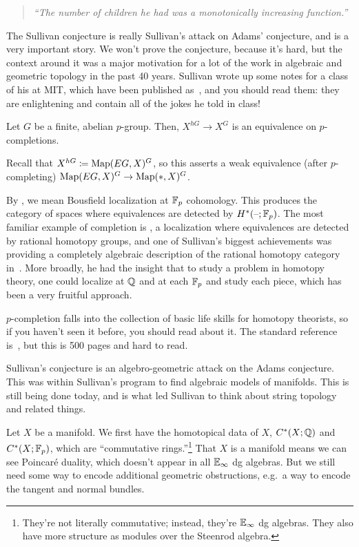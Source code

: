 \begin{quote}\textit{
	``The number of children he had was a monotonically increasing function.''
}\end{quote}
The Sullivan conjecture is really Sullivan's attack on Adams' conjecture, and is a very important story. We won't
prove the conjecture, because it's hard, but the context around it was a major motivation for a lot of the work in
algebraic and geometric topology in the past 40 years. Sullivan wrote up some notes for a class of his at MIT,
which have been published as~\cite{MITNotes}, and you should read them: they are enlightening and contain all of
the jokes he told in class!
\begin{thm}
\label{sullivan}
Let $G$ be a finite, abelian $p$-group. Then, $X^{hG}\to X^G$ is an equivalence on $p$-completions.
\end{thm}
Recall that $X^{hG} \coloneqq\operatorname{Map}(EG, X)^G$, so this asserts a weak equivalence (after $p$-completing) $\operatorname{Map}(EG,
X)^G\to\operatorname{Map}(*, X)^G$.

By , we mean Bousfield localization at $\mathbb F_p$ cohomology. This
produces the category of spaces where equivalences are detected by $H^*(\text{--};\mathbb F_p)$. The most familiar example of
completion is , a localization where equivalences are detected by rational homotopy groups,
and one of Sullivan's biggest achievements was providing a completely algebraic description of the rational
homotopy category in~\cite{SullivanQHT}. More broadly, he had the insight that to study a problem in homotopy
theory, one could localize at $\mathbb Q$ and at each $\mathbb F_p$ and study each piece, which has been a very fruitful
approach.

$p$-completion falls into the collection of basic life skills for homotopy theorists, so if you haven't seen it
before, you should read about it. The standard reference is~\cite{BousfieldKan}, but this is 500 pages and hard to
read.

Sullivan's conjecture is an algebro-geometric attack on the Adams conjecture. This was within Sullivan's program to
find algebraic models of manifolds. This is still being done today, and is what led Sullivan to think about string
topology and related things.

Let $X$ be a manifold. We first have the homotopical data of $X$, $C^*(X;\mathbb Q)$ and $C^*(X;\mathbb F_p)$, which are
``commutative rings.''\footnote{They're not literally commutative; instead, they're $\mathbb E_\infty$ dg
algebras. They also have more structure as modules over the Steenrod algebra.} That $X$ is a
manifold means we can see Poincaré duality, which doesn't appear in all $\mathbb E_\infty$ dg algebras. But we still need
some way to encode additional geometric obstructions, e.g.\ a way to encode the tangent and normal
bundles.

